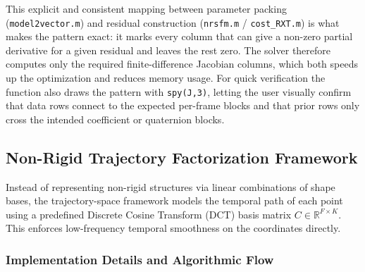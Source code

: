 \documentclass{article}
\begin{document}
This explicit and consistent mapping between parameter packing (\texttt{model2vector.m}) and residual construction (\texttt{nrsfm.m} / \texttt{cost\_RXT.m}) is what makes the pattern exact: it marks every column that can give a non-zero partial derivative for a given residual and leaves the rest zero. The solver therefore computes only the required finite-difference Jacobian columns, which both speeds up the optimization and reduces memory usage. For quick verification the function also draws the pattern with \texttt{spy(J,3)}, letting the user visually confirm that data rows connect to the expected per-frame blocks and that prior rows only cross the intended coefficient or quaternion blocks.

\subsection{Non-Rigid Trajectory Factorization Framework}

Instead of representing non-rigid structures via linear combinations of shape bases, the trajectory-space framework models the temporal path of each point using a predefined Discrete Cosine Transform (DCT) basis matrix $C \in \mathbb{R}^{F \times K}$. This enforces low-frequency temporal smoothness on the coordinates directly.

\subsubsection{Implementation Details and Algorithmic Flow}
\end{document}

